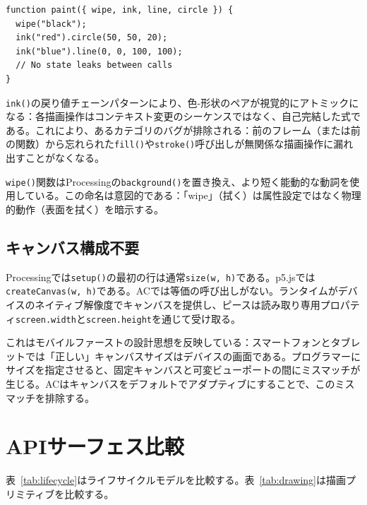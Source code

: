 \documentclass[10pt,letterpaper,twocolumn]{article}
\begin{document}
\begin{lstlisting}[style=acjsstyle]
function paint({ wipe, ink, line, circle }) {
  wipe("black");
  ink("red").circle(50, 50, 20);
  ink("blue").line(0, 0, 100, 100);
  // No state leaks between calls
}
\end{lstlisting}

\texttt{ink()}の戻り値チェーンパターンにより、色-形状のペアが視覚的にアトミックになる：各描画操作はコンテキスト変更のシーケンスではなく、自己完結した式である。これにより、あるカテゴリのバグが排除される：前のフレーム（または前の関数）から忘れられた\texttt{fill()}や\texttt{stroke()}呼び出しが無関係な描画操作に漏れ出すことがなくなる。

\texttt{wipe()}関数はProcessingの\texttt{background()}を置き換え、より短く能動的な動詞を使用している。この命名は意図的である：「wipe」（拭く）は属性設定ではなく物理的動作（表面を拭く）を暗示する。

\subsection{キャンバス構成不要}

Processingでは\texttt{setup()}の最初の行は通常\texttt{size(w, h)}である。p5.jsでは\texttt{createCanvas(w, h)}である。ACでは等価の呼び出しがない。ランタイムがデバイスのネイティブ解像度でキャンバスを提供し、ピースは読み取り専用プロパティ\texttt{screen.width}と\texttt{screen.height}を通じて受け取る。

これはモバイルファーストの設計思想を反映している：スマートフォンとタブレットでは「正しい」キャンバスサイズはデバイスの画面である。プログラマーにサイズを指定させると、固定キャンバスと可変ビューポートの間にミスマッチが生じる。ACはキャンバスをデフォルトでアダプティブにすることで、このミスマッチを排除する。


\section{APIサーフェス比較}
\label{sec:comparison}

表~\ref{tab:lifecycle}はライフサイクルモデルを比較する。表~\ref{tab:drawing}は描画プリミティブを比較する。
\end{document}
